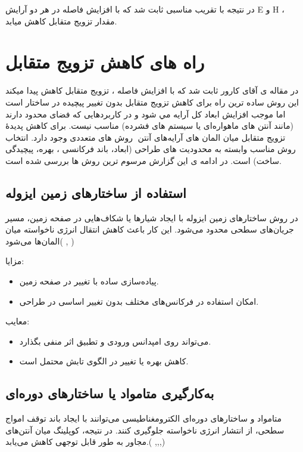 در نتیجه با تقریب مناسبی ثابت شد که با افزایش فاصله در هر دو آرایش E و H ، مقدار تزویج متقابل کاهش میابد.

\section{راه های کاهش تزویج متقابل}
 در مقاله ی آقای کارور ثابت شد که با افزایش فاصله ، تزویج متقابل کاهش پیدا میکند این روش ساده ترین راه برای کاهش تزویج متقابل بدون تغییر پیچیده در ساختار است اما موجب افزایش ابعاد کل  آرایه  مي شود و در کاربردهایی که فضای محدود دارند (مانند آنتن های ماهوارەای یا سیستم های
  فشرده) مناسب نیست. 
برای کاهش پدیدۀ تزویج متقابل میان المان های آرایەهای آنتن،ͬ روش های متعددی وجود دارد. انتخاب روش مناسب وابسته به محدودیت های طراحی (ابعاد، باند فرکانسی ، بهره، پیچیدگی ساخت) است. در ادامه ی این گزارش مرسوم ترین روش ها بررسی شده است.

\subsection{	استفاده از ساختارهای زمین ایزوله}
	در  روش  ساختارهای زمین ایزوله
	 با ایجاد شیارها یا شکاف‌هایی در صفحه زمین، مسیر جریان‌های سطحی محدود می‌شود. این کار باعث کاهش انتقال انرژی ناخواسته میان المان‌ها می‌شود(
	\cite{alibakhshikenari2018antenna}, \cite{emadeddin2017high})
	
	
			مزایا:
	\begin{itemize}
		\item{
	پیاده‌سازی ساده با تغییر در صفحه زمین.
		}
		\item{
امکان استفاده در فرکانس‌های مختلف بدون تغییر اساسی در طراحی.
		}
	\end{itemize}


معایب:
\begin{itemize}
	\item{
	می‌تواند روی امپدانس ورودی و تطبیق اثر منفی بگذارد.
	}
	\item{
	کاهش بهره یا تغییر در الگوی تابش محتمل است.
	}
\end{itemize}


\subsection{
	به‌کارگیری متامواد یا ساختارهای دوره‌ای
}
		متامواد و ساختارهای دوره‌ای الکترومغناطیسی
	 می‌توانند با ایجاد باند توقف امواج سطحی، از انتشار انرژی ناخواسته جلوگیری کنند. در نتیجه، کوپلینگ میان آنتن‌های مجاور به طور قابل توجهی کاهش می‌یابد.(
	\cite{ledimo2022design},\cite{yang2003microstrip},\cite{rahim2008electromagnetic},\cite{tang2020metasurface})
	
